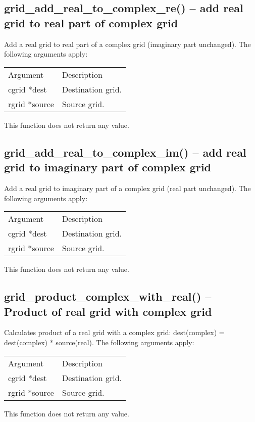 \documentclass[12pt,letterpaper]{report}
\begin{document}
\subsection{grid\_add\_real\_to\_complex\_re() -- add real grid to real part of complex grid}

Add a real grid to real part of a complex grid (imaginary part unchanged). The following arguments apply:
\begin{longtable}{p{} p{}}
Argument & Description\\
\cline{1-2}
cgrid *dest & Destination grid.\\
rgrid *source & Source grid.\\
\end{longtable}
\noindent
This function does not return any value.

\subsection{grid\_add\_real\_to\_complex\_im() -- add real grid to imaginary part of complex grid}

Add a real grid to imaginary part of a complex grid (real part unchanged). The following arguments apply:
\begin{longtable}{p{} p{}}
Argument & Description\\
\cline{1-2}
cgrid *dest & Destination grid.\\
rgrid *source & Source grid.\\
\end{longtable}
\noindent
This function does not return any value.

\subsection{grid\_product\_complex\_with\_real() -- Product of real grid with complex grid}

Calculates product of a real grid with a complex grid: dest(complex) = dest(complex) * source(real). The following arguments apply:
\begin{longtable}{p{} p{}}
Argument & Description\\
\cline{1-2}
cgrid *dest & Destination grid.\\
rgrid *source & Source grid.\\
\end{longtable}
\noindent
This function does not return any value.
\end{document}
